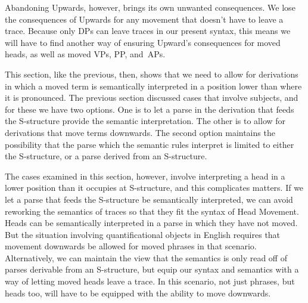 Abandoning Upwards, however, brings its own unwanted consequences. We lose the consequences of Upwards for any movement that doesn't have to leave a trace. Because only DPs can leave traces in our present syntax, this means we will have to find another way of ensuring Upward's consequences for moved heads, as well as moved VPs, PP, and~APs.

This section, like the previous, then, shows that we need to allow for derivations in which a moved term is semantically interpreted in a position lower than where it is pronounced. The previous section discussed cases that involve subjects, and for these we have two options. One is to let a parse in the derivation that feeds the S-structure provide the semantic interpretation. The other is to allow for derivations that move terms downwards. The second option maintains the possibility that the parse which the semantic rules interpret is limited to either the S-structure, or a parse derived from an S-structure. 
	
The cases examined in this section, however, involve interpreting a head in a lower position than it occupies at S-structure, and this complicates matters. If we let a parse that feeds the S-structure be semantically interpreted, we can avoid reworking the semantics of traces so that they fit the syntax of Head Movement. Heads can be semantically interpreted in a parse in which they have not moved. But the situation involving quantificational objects in English requires that movement downwards be allowed for moved phrases in that scenario. Alternatively, we can maintain the view that the semantics is only read off of parses derivable from an S-structure, but equip our syntax and semantics with a way of letting moved heads leave a trace. In this scenario, not just phrases, but heads too, will have to be equipped with the ability to move downwards. 

